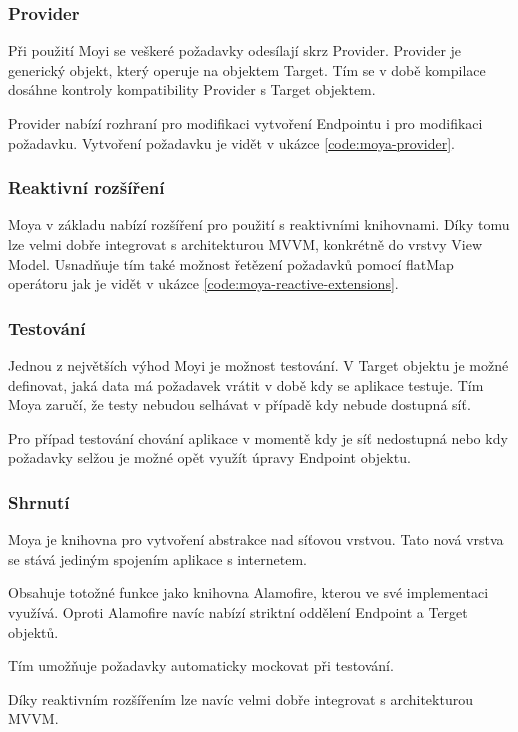 \subsubsection*{Provider}

Při použití Moyi se veškeré požadavky odesílají skrz Provider.
Provider je generický objekt, který operuje na objektem Target.
Tím se v době kompilace dosáhne kontroly kompatibility Provider s Target objektem.

Provider nabízí rozhraní pro modifikaci vytvoření Endpointu i pro modifikaci požadavku.
Vytvoření požadavku je vidět v ukázce \ref{code:moya-provider}.


\subsubsection*{Reaktivní rozšíření}

Moya v základu nabízí rozšíření pro použití s reaktivními knihovnami.
Díky tomu lze velmi dobře integrovat s architekturou MVVM, konkrétně do vrstvy View Model.
Usnadňuje tím také možnost řetězení požadavků pomocí flatMap operátoru jak je vidět v ukázce \ref{code:moya-reactive-extensions}.


\subsubsection*{Testování}

Jednou z největších výhod Moyi je možnost testování.
V Target objektu je možné definovat, jaká data má požadavek vrátit v době kdy se aplikace testuje.
Tím Moya zaručí, že testy nebudou selhávat v případě kdy nebude dostupná síť.

Pro případ testování chování aplikace v momentě kdy je síť nedostupná nebo kdy požadavky selžou je možné opět využít úpravy Endpoint objektu.

\subsubsection*{Shrnutí}

Moya je knihovna pro vytvoření abstrakce nad síťovou vrstvou.
Tato nová vrstva se stává jediným spojením aplikace s internetem.

Obsahuje totožné funkce jako knihovna Alamofire, kterou ve své implementaci využívá.
Oproti Alamofire navíc nabízí striktní oddělení Endpoint a Terget objektů.

Tím umožňuje požadavky automaticky mockovat při testování.

Díky reaktivním rozšířením lze navíc velmi dobře integrovat s architekturou MVVM.